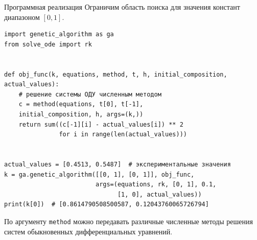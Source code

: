 \documentclass[aspectratio=169, mathserif]{beamer}	%
\begin{document}
\begin{frame}[fragile]{Программная реализация}
\scriptsize
Ограничим область поиска для значения констант диапазоном $[0, 1]$.
\vfill
\begin{verbatim}
import genetic_algorithm as ga
from solve_ode import rk


def obj_func(k, equations, method, t, h, initial_composition, actual_values):
    # решение системы ОДУ численным методом
    c = method(equations, t[0], t[-1],
    initial_composition, h, args=(k,))
    return sum((c[-1][i] - actual_values[i]) ** 2
               for i in range(len(actual_values)))


actual_values = [0.4513, 0.5487]  # экспериментальные значения
k = ga.genetic_algorithm([[0, 1], [0, 1]], obj_func,
                         args=(equations, rk, [0, 1], 0.1,
                               [1, 0], actual_values))
print(k[0])  # [0.8614790508500587, 0.12043760065726794]
\end{verbatim}
\vfill
По аргументу \texttt{method} можно передавать различные численные методы решения систем обыкновенных дифференциальных уравнений.
\vfill
\end{frame}



\end{document}
